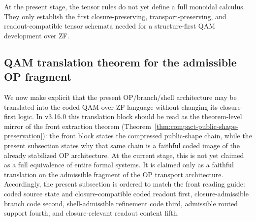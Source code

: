 \begin{remark}
At the present stage, the tensor rules do not yet define a full monoidal calculus. They only establish the first closure-preserving, transport-preserving, and readout-compatible tensor schemata needed for a structure-first QAM development over ZF.
\end{remark}


\subsection*{QAM translation theorem for the admissible OP fragment}

We now make explicit that the present OP/branch/shell architecture may be translated into the coded QAM-over-ZF language without changing its closure-first logic. In v3.16.0 this translation block should be read as the theorem-level mirror of the front extraction theorem (Theorem~\ref{thm:compact-public-shape-preservation}): the front block states the compressed public-shape chain, while the present subsection states why that same chain is a faithful coded image of the already stabilized OP architecture. At the current stage, this is not yet claimed as a full equivalence of entire formal systems. It is claimed only as a faithful translation on the admissible fragment of the OP transport architecture. Accordingly, the present subsection is ordered to match the front reading guide: coded source state and closure-compatible coded readout first, closure-admissible branch code second, shell-admissible refinement code third, admissible routed support fourth, and closure-relevant readout content fifth.

